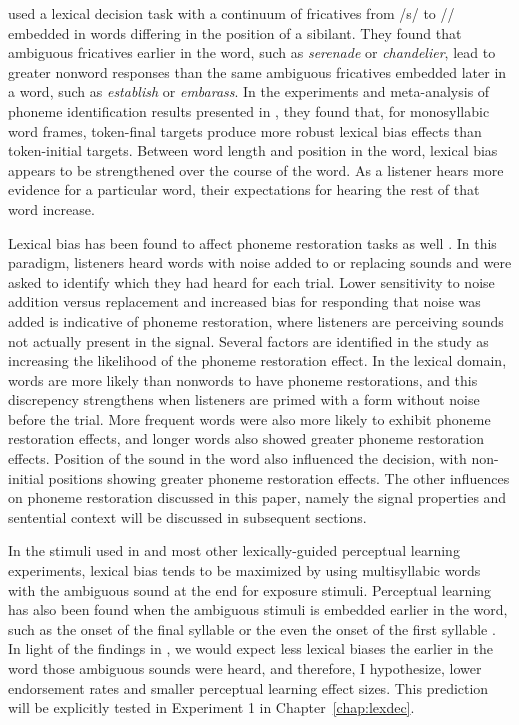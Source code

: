 \citet{Pitt2012} used a lexical decision task with a continuum of fricatives from /s/ to /\textesh/ embedded in words differing in the position of a sibilant.  
They found that ambiguous fricatives earlier in the word, such as \emph{serenade} or \emph{chandelier}, lead to greater nonword responses than the same ambiguous fricatives embedded later in a word, such as \emph{establish} or \emph{embarass}.  
In the experiments and meta-analysis of phoneme identification results presented in \citet{Pitt1993}, they found that, for monosyllabic word frames, token-final targets produce more robust lexical bias effects than token-initial targets.
Between word length and position in the word, lexical bias appears to be strengthened over the course of the word.
As a listener hears more evidence for a particular word, their expectations for hearing the rest of that word increase.

Lexical bias has been found to affect phoneme restoration tasks as well \citep{Samuel1981}.  
In this paradigm, listeners heard words with noise added to or replacing sounds and were asked to identify which they had heard for each trial.  
Lower sensitivity to noise addition versus replacement and increased bias for responding that noise was added is indicative of phoneme restoration, where listeners are perceiving sounds not actually present in the signal.  
Several factors are identified in the study as increasing the likelihood of the phoneme restoration effect.
In the lexical domain, words are more likely than nonwords to have phoneme restorations, and this discrepency strengthens when listeners are primed with a form without noise before the trial.  
More frequent words were also more likely to exhibit phoneme restoration effects, and longer words also showed greater phoneme restoration effects.  
Position of the sound in the word also influenced the decision, with non-initial positions showing greater phoneme restoration effects. 
The other influences on phoneme restoration discussed in this paper, namely the signal properties and sentential context will be discussed in subsequent sections.

In the stimuli used in \citet{Norris2003} and most other lexically-guided perceptual learning experiments, lexical bias tends to be maximized by using multisyllabic words with the ambiguous sound at the end for exposure stimuli.  
Perceptual learning has also been found when the ambiguous stimuli is embedded earlier in the word, such as the onset of the final syllable \citep{Kraljic2005, Kraljic2008, Kraljic2008a} or the even the onset of the first syllable \citep{Clare2014}.  
In light of the findings in \citet{Pitt2012}, we would expect less lexical biases the earlier in the word those ambiguous sounds were heard, and therefore, I hypothesize, lower endorsement rates and smaller perceptual learning effect sizes.  
This prediction will be explicitly tested in Experiment 1 in Chapter~\ref{chap:lexdec}.

